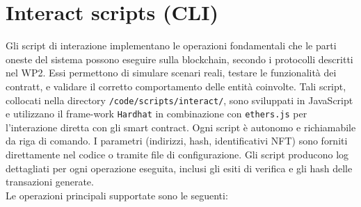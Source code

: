     \section{Interact scripts (CLI)}
        Gli script di interazione implementano le operazioni fondamentali che le parti oneste del sistema possono eseguire sulla blockchain, secondo i protocolli descritti nel WP2. Essi permettono di simulare scenari reali, testare le funzionalità dei contratt, e validare il corretto comportamento delle entità coinvolte. Tali script, collocati nella directory \lstinline{/code/scripts/interact/}, sono sviluppati in JavaScript e utilizzano il frame-work \texttt{Hardhat} in combinazione con \texttt{ethers.js} per l'interazione diretta con gli smart contract.
        Ogni script è autonomo e richiamabile da riga di comando. I parametri (indirizzi, hash, identificativi NFT) sono forniti direttamente nel codice o tramite file di configurazione. Gli script producono log dettagliati per ogni operazione eseguita, inclusi gli esiti di verifica e gli hash delle transazioni generate. \\
        Le operazioni principali supportate sono le seguenti:
